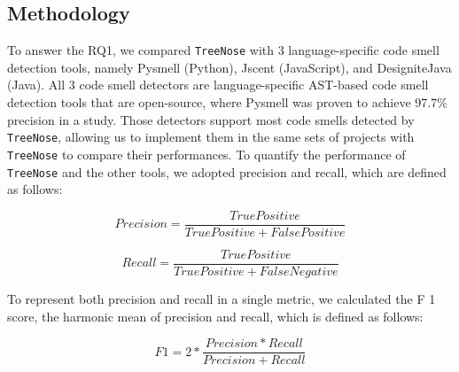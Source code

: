 


\subsection{Methodology}
\label{sec:methodology}

To answer the RQ1, we compared \texttt{TreeNose} with 3 language-specific code smell detection tools, namely Pysmell 
(Python), Jscent (JavaScript), and DesigniteJava (Java).
All 3 code smell detectors are language-specific AST-based code smell detection tools 
that are open-source, where Pysmell was proven to achieve 97.7\% precision in a study.
Those detectors support most code smells detected by \texttt{TreeNose}, allowing us to implement them in the same sets of projects with \texttt{TreeNose} to compare their performances.
To quantify the performance of \texttt{TreeNose} and the other tools, we adopted precision and recall, which are defined as follows:


\begin{equation}
    Precision = \frac{True Positive}{True Positive + False Positive}
\end{equation}

\begin{equation}
    Recall = \frac{True Positive}{True Positive + False Negative}
\end{equation}

To represent both precision and recall in a single metric, we calculated the F 1 score, the harmonic mean of precision and recall, which is defined as follows:

\begin{equation}
    F1 = 2 * \frac{Precision * Recall}{Precision + Recall}
\end{equation}


